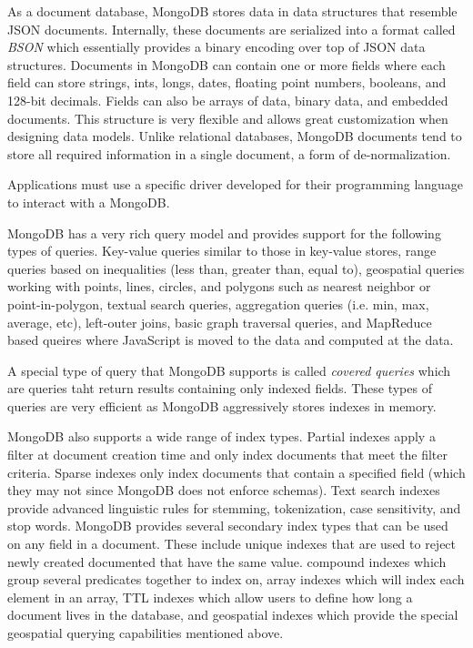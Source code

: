 \documentclass[]{article}
\begin{document}
As a document database, MongoDB stores data in data structures that resemble JSON documents. Internally, these documents are serialized into a format called \textit{BSON} which essentially provides a binary encoding over top of JSON data structures. Documents in MongoDB can contain one or more fields where each field can store strings, ints, longs, dates, floating point numbers, booleans, and 128-bit decimals. Fields can also be arrays of data, binary data, and embedded documents. This structure is very flexible and allows great customization when designing data models. Unlike relational databases, MongoDB documents tend to store all required information in a single document, a form of de-normalization.

Applications must use a specific driver developed for their programming language to interact with a MongoDB\cite{chen_big_2014}.

MongoDB has a very rich query model and provides support for the following types of queries. Key-value queries similar to those in key-value stores, range queries based on inequalities (less than, greater than, equal to), geospatial queries working with points, lines, circles, and polygons such as nearest neighbor or point-in-polygon, textual search queries, aggregation queries (i.e. min, max, average, etc), left-outer joins, basic graph traversal queries, and MapReduce based queires where JavaScript is moved to the data and computed at the data.

A special type of query that MongoDB supports is called \textit{covered queries} which are queries taht return results containing only indexed fields. These types of queries are very efficient as MongoDB aggressively stores indexes in memory.

MongoDB also supports a wide range of index types. Partial indexes apply a filter at document creation time and only index documents that meet the filter criteria. Sparse indexes only index documents that contain a specified field (which they may not since MongoDB does not enforce schemas). Text search indexes provide advanced linguistic rules for stemming, tokenization, case sensitivity, and stop words. MongoDB provides several secondary index types that can be used on any field in a document. These include unique indexes that are used to reject newly created documented that have the same value. compound indexes which group several predicates together to index on, array indexes which will index each element in an array, TTL indexes which allow users to define how long a document lives in the database, and geospatial indexes which provide the special geospatial querying capabilities mentioned above.
\end{document}
